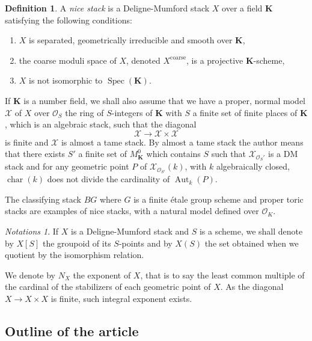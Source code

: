 \documentclass{proc-l}
\newcommand{\K}{\mathbf{K}}
\DeclareMathOperator{\Spec}{Spec}
\DeclareMathOperator{\Aut}{Aut}
\DeclareMathOperator{\car}{char}
\DeclareMathOperator{\coarse}{coarse}
\newcommand{\stackX}{\mathcal{X}}
\newcommand{\sheafO}{\mathcal{O}}
\theoremstyle{definition}
\newtheorem{definition}[theorem]{Definition}
\theoremstyle{remark}
\newtheorem{Notations}[theorem]{Notations}
\numberwithin{equation}{section}
\begin{document}
\begin{definition}
    A \textit{nice stack} is a Deligne-Mumford stack $X$ over a field $\K$ satisfying the following conditions:
    \begin{enumerate}
        \item $X$ is separated, geometrically irreducible and smooth over $\K$,
        \item the coarse moduli space of $X$, denoted $X^{\coarse}$, is a projective $\K$-scheme,
        \item $X$ is not isomorphic to $\Spec(\K)$.
    \end{enumerate}
    If $\K$ is a number field, we shall also assume that we have a proper, normal model $\stackX$ of $X$ over $\sheafO_S$ the ring of $S$-integers of $\K$ with $S$ a finite set of finite places of $\K$, which is an algebraic stack, such that the diagonal $$ \stackX \rightarrow \stackX \times \stackX$$ is finite and $\stackX$ is almost a tame stack. By almost a tame stack the author means that there exists $S'$ a finite set of $M^0_{\K}$ which contains $S$ such that $\stackX_{\sheafO_S'}$ is a DM stack and for any geometric point $P$ of $\stackX_{\sheafO_{S'}}(k)$, with $k$ algebraically closed, $\car(k)$ does not divide the cardinality of $\Aut_k(P)$.
\end{definition}

The classifying stack $B G$ where $G$ is a finite étale group scheme and proper toric stacks are examples of nice stacks, with a natural model defined over $\sheafO_K$.

 \begin{Notations}\label{notation_exponent_algebraic_stack}
    If $X$ is a Deligne-Mumford stack and $S$ is a scheme, we shall denote by $X[S]$ the groupoid of its $S$-points and by $X(S)$ the set obtained when we quotient by the isomorphism relation.

    We denote by $N_X$ the exponent of $X$, that is to say the least common multiple of the cardinal of the stabilizers of each geometric point of $X$. As the diagonal $X \rightarrow X \times X$ is finite, such integral exponent exists.
\end{Notations}

\subsection{Outline of the article}
\end{document}
